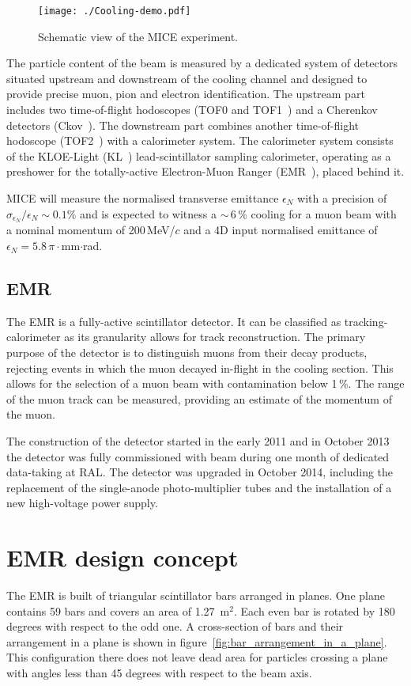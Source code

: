 \documentclass[a4paper,11pt]{article}
\begin{document}
\begin{figure}[h]
 \texttt{[image: ./Cooling-demo.pdf]}
 \caption{Schematic view of the MICE experiment.}
 \label{fig:mice}
\end{figure}

The particle content of the beam is measured by a dedicated system of detectors situated upstream and downstream of the
cooling channel and designed to provide precise muon, pion and electron identification. The upstream part includes two
time-of-flight hodoscopes (TOF0 and TOF1~\cite{TOFref}) and a Cherenkov detectors (Ckov~\cite{MICE_PID}). The downstream part combines another 
time-of-flight hodoscope (TOF2~\cite{Bertoni:tof2}) with a calorimeter system. The calorimeter system consists of the KLOE-Light (KL~\cite{MICE_PID})
lead-scintillator sampling calorimeter, operating
as a preshower for the totally-active Electron-Muon Ranger (EMR~\cite{ruslan}), placed behind it.

MICE will measure the normalised transverse emittance $\epsilon_N$ with a precision of 
$\sigma_{\epsilon_N}/\epsilon_N \sim 0.1 \%$ and is expected to witness a $\sim\,$6\,\% cooling for a muon beam with a nominal momentum
of 200\,MeV/$c$ and a 4D input normalised emittance of $\epsilon_N = 5.8$\,$\pi\cdot$mm$\cdot$rad.

\subsection{EMR}
The EMR is a fully-active scintillator detector. It can be classified as tracking-calorimeter as its granularity allows for track
reconstruction. The primary purpose of the detector is to distinguish muons from their decay products, rejecting events in which
the muon decayed in-flight in the cooling section.  This allows for the selection of a muon beam with contamination
below 1\,\%. The range of the muon track can be measured, providing an estimate of the momentum of the muon. 

The construction of the detector started in the early 2011 and in October 2013 the detector was fully commissioned with beam
during one month of dedicated data-taking at RAL. The detector was upgraded in October 2014, including the replacement of the single-anode
photo-multiplier tubes and the installation of a new high-voltage power supply.

\section{EMR design concept}
The EMR is built of triangular scintillator bars arranged in planes. 
One plane contains 59 bars and covers an area of 1.27~m$^2$. Each even bar is rotated by 180 degrees with respect to the odd one.
A cross-section of bars and their arrangement in a plane is shown in figure~\ref{fig:bar_arrangement_in_a_plane}. This
configuration there does not leave dead area for particles crossing a plane with angles less than 45 degrees with respect to the beam axis.
\end{document}
